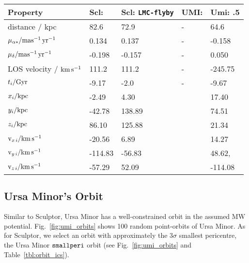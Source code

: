 \begin{table*}[t]
\centering
\caption[Orbit initial conditions]{The orbital initial conditions for models presented in this work. The observables represent the medians from orbital integration used to derived the orbits. Instead, the initial position and velocity represents the initialization of the actual N-body model. The \smallperi{} represents instead the $3\sigma$ smallest pericentre, which we use to provide an upper limit on tidal effects. We describe the \texttt{LMC-flyby} orbit in Section \ref{sec:scl_lmc}. }
\label{tbl:orbit_ics}
\begin{tabular}{lllll}
\toprule
Property & Scl: \smallperi{} & Scl: \verb|LMC-flyby| & UMI: \smallperi{} & Umi: \smallperi{}.5\\
\midrule
distance / kpc & 82.6 & 72.9 & - & 64.6\\
$\mu_{\alpha*} / {\rm mas^{-1}\,yr^{-1}}$ & 0.134 & 0.137 & - & -0.158\\
$\mu_{\delta} / {\rm mas^{-1}\,yr^{-1}}$ & -0.198 & -0.157 & - & 0.050\\
LOS velocity / ${\rm km\,s^{-1}}$ & 111.2 & 111.2 & - & -245.75\\
$t_i / {\rm Gyr}$ & -9.17 & -2.0 & - & -9.67\\
${x}_{i} / {\rm kpc}$ & -2.49 & 4.30 &  & 17.40\\
${y}_{i} / {\rm kpc}$ & -42.78 & 138.89 &  & 74.51\\
${z}_{i} / {\rm kpc}$ & 86.10 & 125.88 &  & 21.34\\
${\rm v}_{x\,i} / {\rm km\,s^{-1}}$ & -20.56 & 6.89 &  & 14.27\\
${\rm v}_{y\,i} / {\rm km\,s^{-1}}$ & -114.83 & -56.83 &  & 48.62,\\
${\rm v}_{z\,i} / {\rm km\,s^{-1}}$ & -57.29 & 52.09 &  & -114.08\\
\bottomrule
\end{tabular}
\end{table*}

\subsection{Ursa Minor's Orbit}\label{sec:orbit_corrections}

Similar to Sculptor, Ursa Minor has a well-constrained orbit in the
assumed MW potential. Fig.~\ref{fig:umi_orbits} shows 100 random
point-orbits of Ursa Minor. As for Sculptor, we select an orbit with
approximately the \(3\sigma\) smallest pericentre, the Ursa Minor
\({\tt smallperi}{}\) orbit (see Fig.~\ref{fig:umi_orbits} and
Table~\ref{tbl:orbit_ics}).

